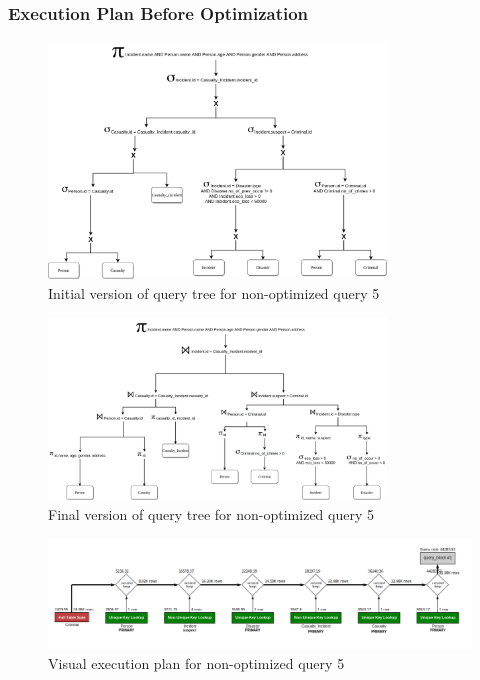 \subsubsection{Execution Plan Before Optimization}
\begin{figure}[H]
    \centering
    \includegraphics[width=0.8\textwidth]{images/query_trees/query5-non-optimized-initial-version.png}
    \caption{Initial version of query tree for non-optimized query 5}
\end{figure}
\begin{figure}[H]
    \centering
    \includegraphics[width=0.8\textwidth]{images/query_trees/query5-non-optimized-final-version.png}
    \caption{Final version of query tree for non-optimized query 5}
\end{figure}
\begin{figure}[H]
    \centering
    \includegraphics[width=\textwidth]{images/execution_plans/q5-1-old.png}
    \caption{Visual execution plan for non-optimized query 5}
\end{figure}

